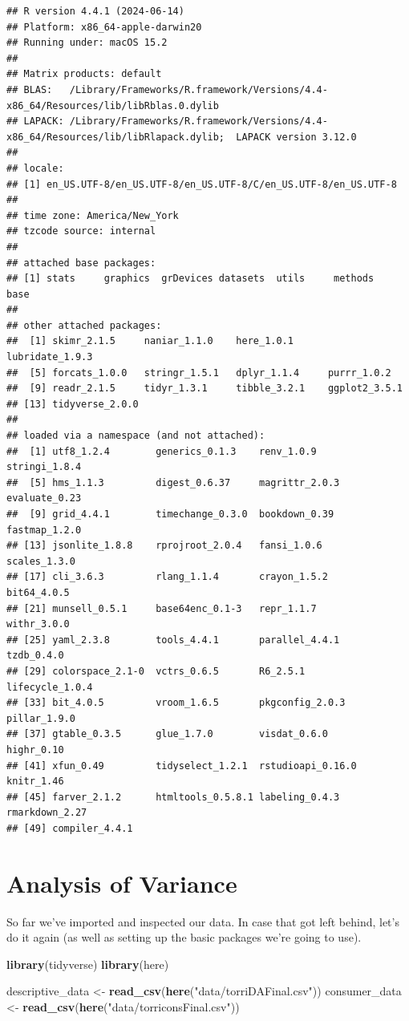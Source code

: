 \documentclass[
]{book}
\newenvironment{Shaded}{\begin{snugshade}}{\end{snugshade}}
\newcommand{\FunctionTok}[1]{\textcolor[rgb]{0.13,0.29,0.53}{\textbf{#1}}}
\newcommand{\NormalTok}[1]{#1}
\newcommand{\OtherTok}[1]{\textcolor[rgb]{0.56,0.35,0.01}{#1}}
\newcommand{\StringTok}[1]{\textcolor[rgb]{0.31,0.60,0.02}{#1}}
\begin{document}
\begin{verbatim}
## R version 4.4.1 (2024-06-14)
## Platform: x86_64-apple-darwin20
## Running under: macOS 15.2
## 
## Matrix products: default
## BLAS:   /Library/Frameworks/R.framework/Versions/4.4-x86_64/Resources/lib/libRblas.0.dylib 
## LAPACK: /Library/Frameworks/R.framework/Versions/4.4-x86_64/Resources/lib/libRlapack.dylib;  LAPACK version 3.12.0
## 
## locale:
## [1] en_US.UTF-8/en_US.UTF-8/en_US.UTF-8/C/en_US.UTF-8/en_US.UTF-8
## 
## time zone: America/New_York
## tzcode source: internal
## 
## attached base packages:
## [1] stats     graphics  grDevices datasets  utils     methods   base     
## 
## other attached packages:
##  [1] skimr_2.1.5     naniar_1.1.0    here_1.0.1      lubridate_1.9.3
##  [5] forcats_1.0.0   stringr_1.5.1   dplyr_1.1.4     purrr_1.0.2    
##  [9] readr_2.1.5     tidyr_1.3.1     tibble_3.2.1    ggplot2_3.5.1  
## [13] tidyverse_2.0.0
## 
## loaded via a namespace (and not attached):
##  [1] utf8_1.2.4        generics_0.1.3    renv_1.0.9        stringi_1.8.4    
##  [5] hms_1.1.3         digest_0.6.37     magrittr_2.0.3    evaluate_0.23    
##  [9] grid_4.4.1        timechange_0.3.0  bookdown_0.39     fastmap_1.2.0    
## [13] jsonlite_1.8.8    rprojroot_2.0.4   fansi_1.0.6       scales_1.3.0     
## [17] cli_3.6.3         rlang_1.1.4       crayon_1.5.2      bit64_4.0.5      
## [21] munsell_0.5.1     base64enc_0.1-3   repr_1.1.7        withr_3.0.0      
## [25] yaml_2.3.8        tools_4.4.1       parallel_4.4.1    tzdb_0.4.0       
## [29] colorspace_2.1-0  vctrs_0.6.5       R6_2.5.1          lifecycle_1.0.4  
## [33] bit_4.0.5         vroom_1.6.5       pkgconfig_2.0.3   pillar_1.9.0     
## [37] gtable_0.3.5      glue_1.7.0        visdat_0.6.0      highr_0.10       
## [41] xfun_0.49         tidyselect_1.2.1  rstudioapi_0.16.0 knitr_1.46       
## [45] farver_2.1.2      htmltools_0.5.8.1 labeling_0.4.3    rmarkdown_2.27   
## [49] compiler_4.4.1
\end{verbatim}

\chapter{Analysis of Variance}\label{analysis-of-variance}

So far we've imported and inspected our data. In case that got left behind, let's do it again (as well as setting up the basic packages we're going to use).

\begin{Shaded}
\begin{Highlighting}[]
\FunctionTok{library}\NormalTok{(tidyverse)}
\FunctionTok{library}\NormalTok{(here)}

\NormalTok{descriptive\_data }\OtherTok{\textless{}{-}} \FunctionTok{read\_csv}\NormalTok{(}\FunctionTok{here}\NormalTok{(}\StringTok{"data/torriDAFinal.csv"}\NormalTok{))}
\NormalTok{consumer\_data }\OtherTok{\textless{}{-}} \FunctionTok{read\_csv}\NormalTok{(}\FunctionTok{here}\NormalTok{(}\StringTok{"data/torriconsFinal.csv"}\NormalTok{))}
\end{Highlighting}
\end{Shaded}
\end{document}
